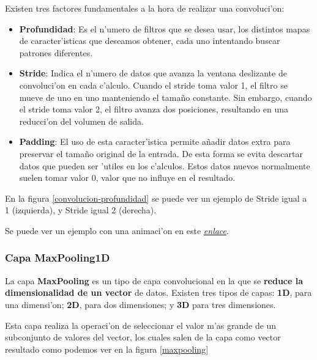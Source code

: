 Existen tres factores fundamentales a la hora de realizar una convoluci'on:



\begin{itemize}
\item \textbf{Profundidad}: Es el n'umero de filtros que se desea usar, los distintos mapas de caracter'isticas que deseamos obtener, cada uno intentando buscar patrones diferentes.
\item \textbf{Stride}: Indica el n'umero de datos que avanza la ventana deslizante de convoluci'on en cada c'alculo. Cuando el stride toma valor 1, el filtro se mueve de uno en uno manteniendo el tamaño constante. Sin embargo, cuando el stride toma valor 2, el filtro avanza dos posiciones, resultando en una reducci'on del volumen de salida.

\item \textbf{Padding}: El uso de esta caracter'istica permite añadir datos extra para preservar el tamaño original de la entrada. De esta forma se evita descartar datos que pueden ser 'utiles en los c'alculos. Estos datos nuevos normalmente suelen tomar valor 0, valor que no influye en el resultado. 

\end{itemize}

\clearpage

En la figura \ref{convolucion-profundidad} se puede ver un ejemplo de Stride igual a 1 (izquierda), y Stride igual 2 (derecha).



Se puede ver un ejemplo con una animaci'on en este  
\href{https://cdn-images-1.medium.com/max/1600/1*VVvdh-BUKFh2pwDD0kPeRA@2x.gif}{\emph{enlace}}.

\subsubsection{Capa MaxPooling1D}

La capa \textbf{MaxPooling} es un tipo de capa convolucional en la que se \textbf{reduce la dimensionalidad de un vector} de datos. Existen tres tipos de capas: \textbf{1D}, para una dimensi'on; \textbf{2D}, para dos dimensiones; y \textbf{3D} para tres dimensiones.

Esta capa realiza la operaci'on de seleccionar el valor m'as grande de un subconjunto de valores del vector, los cuales salen de la capa como vector resultado como podemos ver en la figura \ref{maxpooling}

